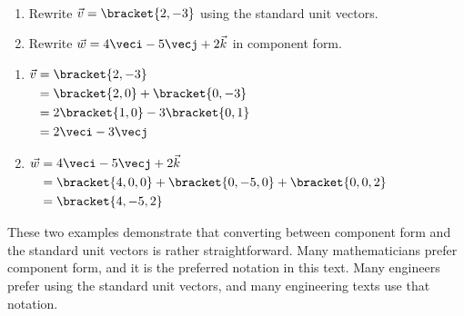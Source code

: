 \begin{example}\label{ex_vect7}
\mbox{}\\[-2\baselineskip]\parbox[t]{\linewidth}{%
\begin{enumerate}
	\item Rewrite $\vec v =\bracket{2,-3}$ using the standard unit vectors.
	\item	Rewrite $\vec w = 4\veci - 5\vecj +2\vec k$ in component form.
\end{enumerate}}\vspace{0pt}
\solution
\begin{enumerate}
	\item  \hfill$\begin{aligned}[t]
		\vec v &=\bracket{2,-3}\\
		&=\bracket{2,0}+\bracket{0,-3}\\
		&= 2\bracket{1,0}-3\bracket{0,1}\\
		&= 2\veci - 3\vecj
	\end{aligned}$\hfill\null
	
	\item	\hfill$\begin{aligned}[t]
		\vec w &= 4\veci - 5\vecj +2\vec k\\
		&=\bracket{4,0,0}+\bracket{0,-5,0}+\bracket{0,0,2}\\
		&=\bracket{4,-5,2}
	\end{aligned}$\hfill\null
\end{enumerate}
These two examples demonstrate that converting between component form and the standard unit vectors is rather straightforward. Many mathematicians prefer component form, and it is the preferred notation in this text. Many engineers prefer using the standard unit vectors, and many engineering texts use that notation.
\end{example}

